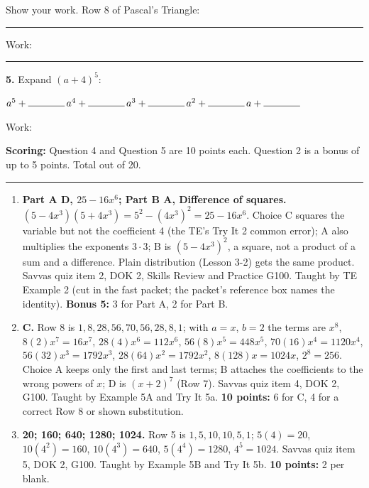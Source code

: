 \documentclass[11pt]{article}
\begin{document}
Show your work. Row 8 of Pascal's Triangle: \rule{8cm}{0.4pt}

Work:

\vspace{2.6cm}

\noindent\rule{\textwidth}{0.4pt}

\vspace{6pt}
\textbf{5.} Expand $(a+4)^5$:

\vspace{8pt}
\begin{center}
$a^5+\rule{1.3cm}{0.4pt}\,a^4+\rule{1.3cm}{0.4pt}\,a^3+\rule{1.3cm}{0.4pt}\,a^2+\rule{1.3cm}{0.4pt}\,a+\rule{1.3cm}{0.4pt}$
\end{center}

Work:

\vfill
\noindent\textbf{Scoring:} Question 4 and Question 5 are 10 points each. Question 2 is a bonus of up to 5 points. Total out of 20.

\newpage
{}

\vspace{4pt}\noindent\rule{\textwidth}{0.6pt}

\begin{enumerate}
\item[\textbf{2.}] \textbf{Part A D, $25-16x^6$; Part B A, Difference of squares.} $(5-4x^3)(5+4x^3)=5^2-(4x^3)^2=25-16x^6$. Choice C squares the variable but not the coefficient 4 (the TE's Try It 2 common error); A also multiplies the exponents $3\cdot3$; B is $(5-4x^3)^2$, a square, not a product of a sum and a difference. Plain distribution (Lesson 3-2) gets the same product. Savvas quiz item 2, DOK 2, Skills Review and Practice G100. Taught by TE Example 2 (cut in the fast packet; the packet's reference box names the identity). \textbf{Bonus 5:} 3 for Part A, 2 for Part B.
\item[\textbf{4.}] \textbf{C.} Row 8 is $1,8,28,56,70,56,28,8,1$; with $a=x$, $b=2$ the terms are $x^8$, $8(2)x^7=16x^7$, $28(4)x^6=112x^6$, $56(8)x^5=448x^5$, $70(16)x^4=1120x^4$, $56(32)x^3=1792x^3$, $28(64)x^2=1792x^2$, $8(128)x=1024x$, $2^8=256$. Choice A keeps only the first and last terms; B attaches the coefficients to the wrong powers of $x$; D is $(x+2)^7$ (Row 7). Savvas quiz item 4, DOK 2, G100. Taught by Example 5A and Try It 5a. \textbf{10 points:} 6 for C, 4 for a correct Row 8 or shown substitution.
\item[\textbf{5.}] \textbf{20; 160; 640; 1280; 1024.} Row 5 is $1,5,10,10,5,1$; $5(4)=20$, $10(4^2)=160$, $10(4^3)=640$, $5(4^4)=1280$, $4^5=1024$. Savvas quiz item 5, DOK 2, G100. Taught by Example 5B and Try It 5b. \textbf{10 points:} 2 per blank.
\end{enumerate}
\end{document}
